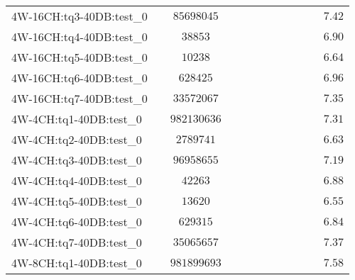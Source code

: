 \begin{tabular}{|l|c|c|c|c|c|c|c|c|c|c|c|}
4W-16CH:tq3-40DB:test\_0  & $          $ & $ 85698045    $ & $       $ & $  $ & $    $ & $       $ & $  $ & $   $ & $             $ & $         $ & $ 7.42    $ \\
4W-16CH:tq4-40DB:test\_0  & $          $ & $ 38853       $ & $       $ & $  $ & $    $ & $       $ & $  $ & $   $ & $             $ & $         $ & $ 6.90    $ \\
4W-16CH:tq5-40DB:test\_0  & $          $ & $ 10238       $ & $       $ & $  $ & $    $ & $       $ & $  $ & $   $ & $             $ & $         $ & $ 6.64    $ \\
4W-16CH:tq6-40DB:test\_0  & $          $ & $ 628425      $ & $       $ & $  $ & $    $ & $       $ & $  $ & $   $ & $             $ & $         $ & $ 6.96    $ \\
4W-16CH:tq7-40DB:test\_0  & $          $ & $ 33572067    $ & $       $ & $  $ & $    $ & $       $ & $  $ & $   $ & $             $ & $         $ & $ 7.35    $ \\
4W-4CH:tq1-40DB:test\_0   & $          $ & $ 982130636   $ & $       $ & $  $ & $    $ & $       $ & $  $ & $   $ & $             $ & $         $ & $ 7.31    $ \\
4W-4CH:tq2-40DB:test\_0   & $          $ & $ 2789741     $ & $       $ & $  $ & $    $ & $       $ & $  $ & $   $ & $             $ & $         $ & $ 6.63    $ \\
4W-4CH:tq3-40DB:test\_0   & $          $ & $ 96958655    $ & $       $ & $  $ & $    $ & $       $ & $  $ & $   $ & $             $ & $         $ & $ 7.19    $ \\
4W-4CH:tq4-40DB:test\_0   & $          $ & $ 42263       $ & $       $ & $  $ & $    $ & $       $ & $  $ & $   $ & $             $ & $         $ & $ 6.88    $ \\
4W-4CH:tq5-40DB:test\_0   & $          $ & $ 13620       $ & $       $ & $  $ & $    $ & $       $ & $  $ & $   $ & $             $ & $         $ & $ 6.55    $ \\
4W-4CH:tq6-40DB:test\_0   & $          $ & $ 629315      $ & $       $ & $  $ & $    $ & $       $ & $  $ & $   $ & $             $ & $         $ & $ 6.84    $ \\
4W-4CH:tq7-40DB:test\_0   & $          $ & $ 35065657    $ & $       $ & $  $ & $    $ & $       $ & $  $ & $   $ & $             $ & $         $ & $ 7.37    $ \\
4W-8CH:tq1-40DB:test\_0   & $          $ & $ 981899693   $ & $       $ & $  $ & $    $ & $       $ & $  $ & $   $ & $             $ & $         $ & $ 7.58    $ \\

\end{tabular}

